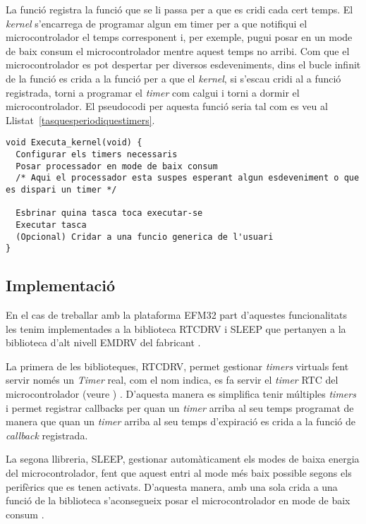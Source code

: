 La funció  registra la funció que se li passa per a que es cridi cada cert temps. El {\em kernel} s'encarrega de programar algun {em timer} per a que notifiqui el microcontrolador el temps corresponent i, per exemple, pugui posar en un mode de baix consum el microcontrolador mentre aquest temps no arribi.
Com que el microcontrolador es pot despertar per diversos esdeveniments, dins el bucle infinit de la funció  es crida a la funció per a que el {\em kernel}, si s'escau cridi al a funció registrada, torni a programar el {\em timer} com calgui i torni a dormir el microcontrolador. El pseudocodi per aquesta funció seria tal com es veu al Llistat~\ref{tasquesperiodiquestimers}.

\begin{lstlisting}[style=customc,caption={Estructura bàsica de la funció Executa\_kernel()},label=tasquesperiodiquestimers]
void Executa_kernel(void) {
  Configurar els timers necessaris
  Posar processador en mode de baix consum
  /* Aqui el processador esta suspes esperant algun esdeveniment o que es dispari un timer */

  Esbrinar quina tasca toca executar-se
  Executar tasca 
  (Opcional) Cridar a una funcio generica de l'usuari
}
\end{lstlisting}

\subsection{Implementació}
En el cas de treballar amb la plataforma EFM32 part d'aquestes funcionalitats les tenim implementades a la biblioteca RTCDRV i SLEEP que pertanyen a la biblioteca d'alt nivell EMDRV del fabricant \cite{EMDRV}. 

La primera de les biblioteques, RTCDRV, permet gestionar {\em timers} virtuals fent servir només un {\em Timer} real, com el nom indica, es fa servir el {\em timer} RTC del microcontrolador (veure ) \cite{RTCDRV}. D'aquesta manera es simplifica tenir múltiples {\em timers} i permet registrar \glspl{callback} per quan un {\em timer} arriba al seu temps programat de manera que quan un {\em timer} arriba al seu temps d'expiració es crida a la funció de {\em callback} registrada. 

La segona llibreria, SLEEP, gestionar automàticament els modes de baixa energia del microcontrolador, fent que aquest entri al mode més baix possible segons els perifèrics que es tenen activats. D'aquesta manera, amb una sola crida a una funció de la biblioteca s'aconsegueix posar el microcontrolador en mode de baix consum \cite{SLEEPDRV}.

